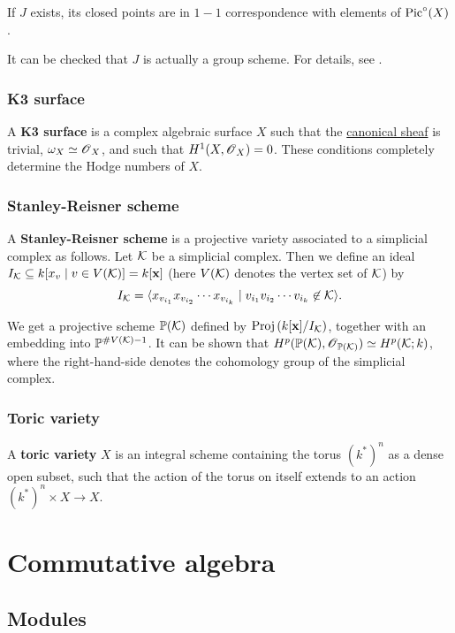 \documentclass[11pt, english]{article}
\begin{document}
If $J$ exists, its closed points are in $1-1$ correspondence with elements of $\operatorname{Pic}^\circ (X)$.

It can be checked that $J$ is actually a group scheme. For details, see \cite[Ch. IV.4]{hartshorne}.

\subsubsection{K3 surface}
\label{k3}

A \textbf{K3 surface} is a complex algebraic surface $X$ such that the \hyperref[canonicaldivisor]{canonical sheaf} is trivial, $\omega_X \simeq \operatorname{\mathscr{O}}_X$, and such that $H^1(X,\operatorname{\mathscr{O}}_X)=0$. These conditions completely determine the Hodge numbers of $X$.

\subsubsection{Stanley-Reisner scheme}
\label{srscheme}

A \textbf{Stanley-Reisner scheme} is a projective variety associated to a simplicial complex as follows. Let $\mathcal K$ be a simplicial complex. Then we define an ideal $I_\mathcal K \subseteq k[x_v \mid v \in V(\mathcal K)] = k[\mathbf x]$ (here $V(\mathcal K)$ denotes the vertex set of $\mathcal K$) by
\[
I_\mathcal K = \langle x_{v_{i_1}}x_{v_{i_2}}\cdots x_{v_{i_k}} \mid v_{i_1}v_{i_2}\cdots v_{i_k} \not \in \mathcal K \rangle.
\]

We get a projective scheme $\mathbb{P}(\mathcal K)$ defined by $\operatorname{Proj} \left (k[ \mathbf x]/I_\mathcal K \right)$, together with an embedding into $\mathbb{P}^{\# V(\mathcal K)-1}$. It can be shown that $H^p(\mathbb{P}(\mathcal K),\operatorname{\mathscr{O}}_{\mathbb{P}(\mathcal K)}) \simeq H^p(\mathcal K;k)$, where the right-hand-side denotes the cohomology group of the simplicial complex.

\subsubsection{Toric variety}
\label{toricvariety}

A \textbf{toric variety} $X$ is an integral scheme containing the torus $(k^\ast)^n$ as a dense open subset, such that the action of the torus on itself extends to an action $(k^\ast)^n \times X \to X$.

\section{Commutative algebra}
\subsection{Modules}
\end{document}
